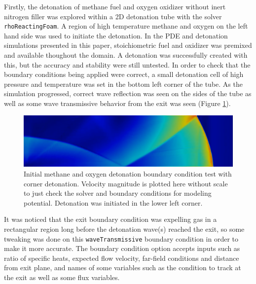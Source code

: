 Firstly, the detonation of methane fuel and oxygen oxidizer without inert nitrogen filler was explored within a 2D detonation tube with the solver \verb|rhoReactingFoam|. A region of high temperature methane and oxygen on the left hand side was used to initiate the detonation. In the PDE and detonation simulations presented in this paper, stoichiometric fuel and oxidizer was premixed and available thoughout the domain. 
A detonation was successfully created with this, but the accuracy and stability were still untested. In order to check that the boundary conditions being applied were correct, a small detonation cell of high pressure and temperature was set in the bottom left corner of the tube. As the simulation progressed, correct wave reflection was seen on the sides of the tube as well as some wave transmissive behavior from the exit was seen (Figure \ref{fig:cornerdet}). 
\begin{figure}[b]
\centering
\includegraphics[width=\linewidth]{figs/cornerdet.png}
\caption{Initial methane and oxygen detonation boundary condition test with corner detonation. Velocity magnitude is plotted here without scale to just check the solver and boundary conditions for modeling potential. Detonation was initiated in the lower left corner.}
\label{fig:cornerdet}
\end{figure}%
\noindent It was noticed that the exit boundary condition was expelling gas in a rectangular region long before the detonation wave(s) reached the exit, so some tweaking was done on this \verb|waveTransmissive| boundary condition in order to make it more accurate. The boundary condition option accepts inputs such as ratio of specific heats, expected flow velocity, far-field conditions and distance from exit plane, and names of some variables such as the condition to track at the exit as well as some flux variables. 

